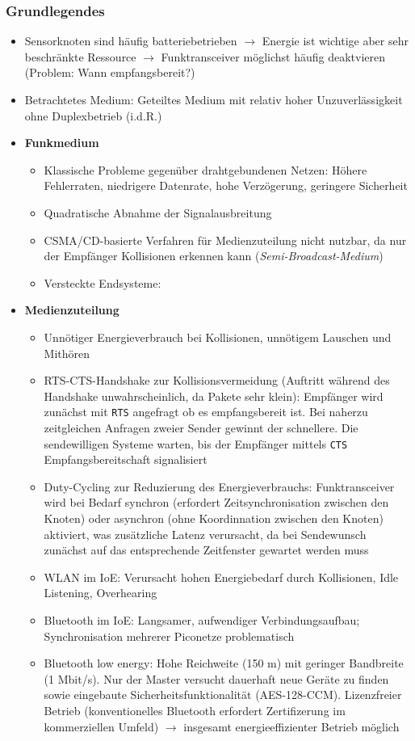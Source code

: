 \subsubsection{Grundlegendes}
\begin{itemize}
	\item Sensorknoten sind häufig batteriebetrieben \(\rightarrow\) Energie ist wichtige aber sehr beschränkte Ressource \(\rightarrow\) Funktransceiver möglichst häufig deaktvieren (Problem: Wann empfangsbereit?)
	\item Betrachtetes Medium: Geteiltes Medium mit relativ hoher Unzuverlässigkeit ohne Duplexbetrieb (i.d.R.)
	\item \textbf{Funkmedium}
	\begin{itemize}
		\item Klassische Probleme gegenüber drahtgebundenen Netzen: Höhere Fehlerraten, niedrigere Datenrate, hohe Verzögerung, geringere Sicherheit
		\item Quadratische Abnahme der Signalausbreitung
		\item CSMA/CD-basierte Verfahren für Medienzuteilung nicht nutzbar, da nur der Empfänger Kollisionen erkennen kann (\textit{Semi-Broadcast-Medium})
		\item Versteckte Endsysteme: 
	\end{itemize}
	\item \textbf{Medienzuteilung}
	\begin{itemize}
		\item Unnötiger Energieverbrauch bei Kollisionen, unnötigem Lauschen und Mithören
		\item RTS-CTS-Handshake zur Kollisionsvermeidung (Auftritt während des Handshake unwahrscheinlich, da Pakete sehr klein): Empfänger wird zunächst mit \texttt{RTS} angefragt ob es empfangsbereit ist. Bei naherzu zeitgleichen Anfragen zweier Sender gewinnt der schnellere. Die sendewilligen Systeme warten, bis der Empfänger mittels \texttt{CTS} Empfangsbereitschaft signalisiert
		\item Duty-Cycling zur Reduzierung des Energieverbrauchs: Funktransceiver wird bei Bedarf synchron (erfordert Zeitsynchronisation zwischen den Knoten) oder asynchron (ohne Koordinnation zwischen den Knoten) aktiviert, was zusätzliche Latenz verursacht, da bei Sendewunsch zunächst auf das entsprechende Zeitfenster gewartet werden muss
		\item WLAN im IoE: Verursacht hohen Energiebedarf durch Kollisionen, Idle Listening, Overhearing
		\item Bluetooth im IoE: Langsamer, aufwendiger Verbindungsaufbau; Synchronisation mehrerer Piconetze problematisch
		\item Bluetooth low energy: Hohe Reichweite (150 m) mit geringer Bandbreite (1 Mbit/s). Nur der Master versucht dauerhaft neue Geräte zu finden sowie eingebaute Sicherheitsfunktionalität (AES-128-CCM). Lizenzfreier Betrieb (konventionelles Bluetooth erfordert Zertifizerung im kommerziellen Umfeld) \(\rightarrow\) insgesamt energieeffizienter Betrieb möglich
	\end{itemize}
\end{itemize}


